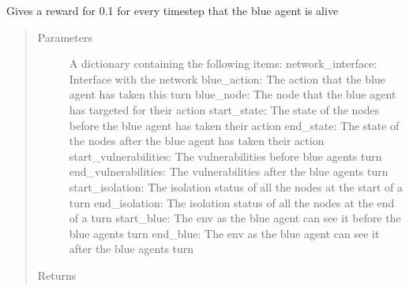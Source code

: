 \documentclass[letterpaper,10pt,english]{sphinxmanual}
\begin{document}
\begin{fulllineitems}
\label{\detokenize{source/yawning_titan.envs.generic.core:yawning_titan.envs.generic.core.reward_functions.one_per_timestep}}
\sphinxAtStartPar
Gives a reward for 0.1 for every timestep that the blue agent is alive
\begin{quote}\begin{description}
\item[{Parameters}] \leavevmode
\sphinxAtStartPar
{} \textendash{} A dictionary containing the following items:
network\_interface: Interface with the network
blue\_action: The action that the blue agent has taken this turn
blue\_node: The node that the blue agent has targeted for their action
start\_state: The state of the nodes before the blue agent has taken their action
end\_state: The state of the nodes after the blue agent has taken their action
start\_vulnerabilities: The vulnerabilities before blue agents turn
end\_vulnerabilities: The vulnerabilities after the blue agents turn
start\_isolation: The isolation status of all the nodes at the start of a turn
end\_isolation: The isolation status of all the nodes at the end of a turn
start\_blue: The env as the blue agent can see it before the blue agents turn
end\_blue: The env as the blue agent can see it after the blue agents turn

\item[{Returns}] \leavevmode
{}

\end{description}\end{quote}

\end{fulllineitems}

\end{document}
